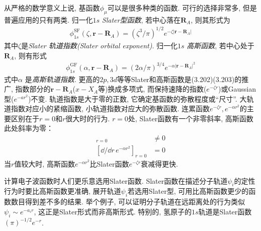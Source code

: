 从严格的数学意义上说, 基函数$\phi_\mu$可以是很多种类的函数. 可行的选择非常多, 但是普遍应用的只有两类. 归一化$1s$ \emph{Slater型函数}, 若中心落在$\mathbf{R}_A$, 则其形式为
\begin{align}
\phi_{1s}^\mathrm{SF}(\zeta,\mathbf{r-R}_A) = (\zeta^3/\pi)^{1/2}e^{-\zeta|\mathbf{r-R}_A|}
\end{align}
其中$\zeta$是\emph{Slater 轨道指数(Slater orbital exponent)}. 归一化$1s$ \emph{高斯函数}, 若中心处于$\mathbf{R}_A$, 则有形式
\begin{align}
\phi_{1s}^\mathrm{GF}(\alpha,\mathbf{r-R}_A) = (2\alpha/\pi)^{3/4}e^{-\alpha|\mathbf{r-R}_A|^2}
\end{align}
式中$\alpha$ 是\emph{高斯轨道指数}. 更高的$2p,3d$等等Slater和高斯函数是(3.202)(3.203)的推广, 指数部分的$\mathbf{r-R}_A$($x-X_A$等)换成多项式, 而保持速降的指数($e^{-\zeta r}$)或Gaussian型($e^{-ar^2}$)不变. 轨道指数是大于零的正数, 它确定基函数的弥散程度或``尺寸''. 大轨道指数对应小的紧缩函数, 小轨道指数对应大的弥散函数. 连累函数$e^{-\zeta r},e^{-\alpha r^2}$的主要区别在于$r=0$和$r$很大时的行为. $r=0$处, Slater函数有一个非零斜率, 高斯函数此处斜率为零：
\begin{align}
[\dd/\dd r\, e^{-\zeta r}]_{r=0}& \neq 0\\
[\dd/\dd r\, e^{-\alpha r^2}]_{r=0}&  =   0
\end{align}
当$r$值较大时, 高斯函数$e^{-\alpha r^2}$比Slater函数$e^{-\zeta r}$衰减得更快.

计算电子波函数时人们更乐意选用Slater函数. Slater函数在描述分子轨道$\psi_i$的定性行为时要比高斯函数更准确, 展开轨道$\psi_i$若选用Slater型, 可用比高斯函数更少的函数数目得到差不多的结果. 举个例子, 可以证明分子轨道在远距离处的行为类似$\psi_i\sim e^{-a_ir}$, 这正是Slater形式而非高斯形式. 特别的, 氢原子的$1s$轨道是Slater函数$(\pi)^{-1/2}e^{-r}$.

